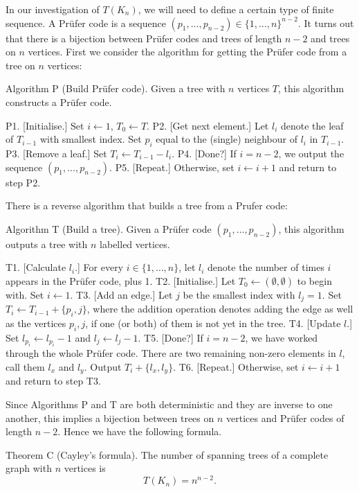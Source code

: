 In our investigation of $T(K_n)$, we will need to define a certain type of finite sequence. A Pr{\"u}fer code is a sequence $(p_1, \ldots, p_{n-2})\in \{1,\ldots,n\}^{n-2}$. It turns out that there is a bijection between Pr{\"u}fer codes and trees of length $n-2$ and trees on $n$ vertices. First we consider the algorithm for getting the Pr{\"u}fer code from a tree on $n$ vertices:

\algbegin Algorithm P (Build Pr{\"u}fer code). Given a tree with $n$ vertices $T$, this algorithm constructs a Pr{\"u}fer code.

\algstep P1. [Initialise.] Set $i\gets 1$, $T_0\gets T$.
\algstep P2. [Get next element.] Let $l_i$ denote the leaf of $T_{i-1}$ with smallest index. Set $p_i$ equal to the (single) neighbour of $l_i$ in $T_{i-1}$.
\algstep P3. [Remove a leaf.] Set $T_i\gets T_{i-1}-l_i$.
\algstep P4. [Done?] If $i=n-2$, we output the sequence $(p_1,\ldots, p_{n-2})$. 
\algstep P5. [Repeat.] Otherwise, set $i\gets i+1$ and return to step P2. \slug

There is a reverse algorithm that builds a tree from a Prufer code:

\algbegin Algorithm T (Build a tree). Given a Pr{\"u}fer code $(p_1,\ldots, p_{n-2})$, this algorithm outputs a tree with $n$ labelled vertices.

\algstep T1. [Calculate $l_i$.] For every $i\in \{1, \ldots, n\}$, let $l_i$ denote the number of times $i$ appears in the Pr{\"u}fer code, plus 1.
\algstep T2. [Initialise.] Let $T_0 \gets(\emptyset, \emptyset)$ to begin with. Set $i\gets 1$.
\algstep T3. [Add an edge.] Let $j$ be the smallest index with $l_j = 1$. Set $T_i \gets T_{i-1} + \{p_i, j\}$, where the addition operation denotes adding the edge as well as the vertices $p_i, j$, if one (or both) of them is not yet in the tree.
\algstep T4. [Update $l$.] Set $l_{p_i} \gets l_{p_i} - 1$ and $l_j \gets l_j - 1$.
\algstep T5. [Done?] If $i = n-2$, we have worked through the whole Pr{\"u}fer code. There are two remaining non-zero elements in $l$, call them $l_x$ and $l_y$. Output $T_i + \{l_x, l_y\}$.
\algstep T6. [Repeat.] Otherwise, set $i\gets i+1$ and return to step T3. \slug

Since Algorithms P and T are both deterministic and they are inverse to one another, this implies a bijection between trees on $n$ vertices and Pr{\"u}fer codes of length $n-2$. Hence we have the following formula.

\parenproclaim Theorem C (Cayley's formula). The number of spanning trees of a complete graph with $n$ vertices is
$$ T(K_n) = n^{n-2}.$$

